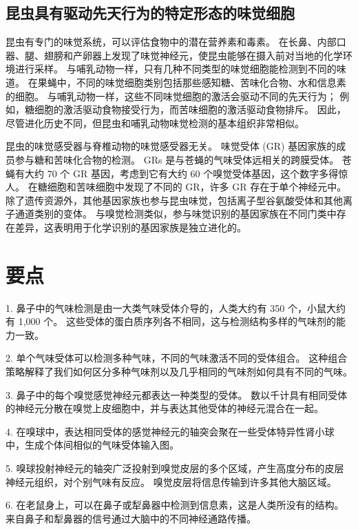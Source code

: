 \subsection{昆虫具有驱动先天行为的特定形态的味觉细胞}

昆虫有专门的味觉系统，可以评估食物中的潜在营养素和毒素。
在长鼻、内部口器、腿、翅膀和产卵器上发现了味觉神经元，使昆虫能够在摄入前对当地的化学环境进行采样。
与哺乳动物一样，只有几种不同类型的味觉细胞能检测到不同的味道。
在果蝇中，不同的味觉细胞类别包括那些感知糖、苦味化合物、水和信息素的细胞。
与哺乳动物一样，这些不同味觉细胞的激活会驱动不同的先天行为；
例如，糖细胞的激活驱动食物接受行为，而苦味细胞的激活驱动食物排斥。
因此，尽管进化历史不同，但昆虫和哺乳动物味觉检测的基本组织非常相似。


昆虫的味觉感受器与脊椎动物的味觉感受器无关。
味觉受体 (GR) 基因家族的成员参与糖和苦味化合物的检测。
GRs 是与苍蝇的气味受体远相关的跨膜受体。
苍蝇有大约 70 个 GR 基因，考虑到它有大约 60 个嗅觉受体基因，这个数字多得惊人。
在糖细胞和苦味细胞中发现了不同的 GR，许多 GR 存在于单个神经元中。
除了遗传资源外，其他基因家族也参与昆虫味觉，包括离子型谷氨酸受体和其他离子通道类别的变体。
与嗅觉检测类似，参与味觉识别的基因家族在不同门类中存在差异，这表明用于化学识别的基因家族是独立进化的。



\section{要点}

1. 鼻子中的气味检测是由一大类气味受体介导的，人类大约有 350 个，小鼠大约有 1,000 个。
这些受体的蛋白质序列各不相同，这与检测结构多样的气味剂的能力一致。


2. 单个气味受体可以检测多种气味，不同的气味激活不同的受体组合。
这种组合策略解释了我们如何区分多种气味剂以及几乎相同的气味剂如何具有不同的气味。 


3. 鼻子中的每个嗅觉感觉神经元都表达一种类型的受体。
数以千计具有相同受体的神经元分散在嗅觉上皮细胞中，并与表达其他受体的神经元混合在一起。


4. 在嗅球中，表达相同受体的感觉神经元的轴突会聚在一些受体特异性肾小球中，生成个体间相似的气味受体输入图。


5. 嗅球投射神经元的轴突广泛投射到嗅觉皮层的多个区域，产生高度分布的皮层神经元组织，对个别气味有反应。
嗅觉皮层将信息传输到许多其他大脑区域。


6. 在老鼠身上，可以在鼻子或犁鼻器中检测到信息素，这是人类所没有的结构。
来自鼻子和犁鼻器的信号通过大脑中的不同神经通路传播。


